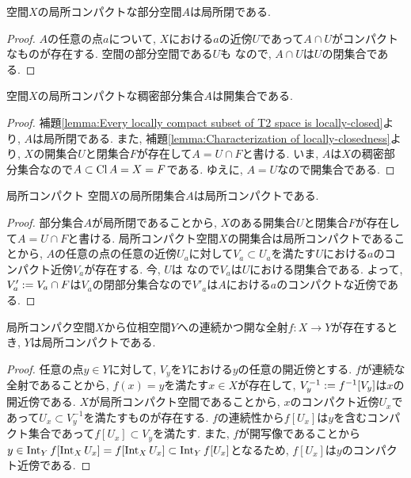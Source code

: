 \documentclass[uplatex, dvipdfmx, a4paper, 12pt, class=jsbook, crop=false]{standalone}
\begin{document}
\begin{proposition}
	\label{lemma:Every locally compact subset of T2 space is locally-closed}
	\Hausdorff 空間$ X $の局所コンパクトな部分空間$ A $は局所閉である.
\end{proposition}

\begin{proof}
	$ A $の任意の点$ a $について, $ X $における$ a $の近傍$ U $であって$ A \cap U $がコンパクトなものが存在する. \Hausdorff 空間の部分空間である$ U $も \Hausdorff なので, $ A \cap U $は$ U $の閉集合である.
\end{proof}

\begin{proposition}
	\label{prop:Any locally compact dense set of a Hausdorff space is open}
	\Hausdorff 空間$ X $の局所コンパクトな稠密部分集合$ A $は開集合である.
\end{proposition}

\begin{proof}
	補題\ref{lemma:Every locally compact subset of T2 space is locally-closed}より, $ A $は局所閉である. また, 補題\ref{lemma:Characterization of locally-closedness}より, $ X $の開集合$ U $と閉集合$ F $が存在して$ A = U \cap F $と書ける. いま, $ A $は$ X $の稠密部分集合なので$ A \subset \mathop{\mathrm{Cl}}\nolimits A = X = F $である. ゆえに, $ A = U $なので開集合である.
\end{proof}

\begin{proposition}
	局所コンパクト \Hausdorff 空間$ X $の局所閉集合$ A $は局所コンパクトである.
\end{proposition}

\begin{proof}
	部分集合$ A $が局所閉であることから, $ X $のある開集合$ U $と閉集合$ F $が存在して$ A = U \cap F $と書ける. 局所コンパクト空間$ X $の開集合は局所コンパクトであることから, $ A $の任意の点の任意の近傍$ U_a $に対して$ V_a \subset U_a $を満たす$ U $における$ a $のコンパクト近傍$ V_a $が存在する. 今, $ U $は \Hausdorff なので$ V_a $は$ U $における閉集合である. よって, $ V'_a \mathrel{:=} V_a \cap F $は$ V_a $の閉部分集合なので$ V'_a $は$ A $における$ a $のコンパクトな近傍である. 
\end{proof}

\begin{proposition}
	局所コンパク空間$ X $から位相空間$ Y $への連続かつ開な全射$ f \colon X \to Y $が存在するとき, $ Y $は局所コンパクトである.
\end{proposition}

\begin{proof}
	任意の点$ y \in Y $に対して, $ V_y $を$ Y $における$ y $の任意の開近傍とする. $ f $が連続な全射であることから, $f(x) = y $を満たす$ x \in X $が存在して, $ V_y^{-1} \mathrel{:=} 
	f^{-1}[V_y] $は$ x $の開近傍である. $ X $が局所コンパクト空間であることから, $ x $のコンパクト近傍$ U_x $であって$ U_x \subset V_y^{-1} $を満たすものが存在する. $ f $の連続性から$ f[U_x] $は$ y $を含むコンパクト集合であって$ f[U_x] \subset V_y $を満たす. また, $ f $が開写像であることから$ y \in \mathop{\mathrm{Int}}\nolimits_Y f[\mathop{\mathrm{Int}}\nolimits_X U_x] = f[\mathop{\mathrm{Int}}\nolimits_X U_x] \subset \mathop{\mathrm{Int}}\nolimits_Y f[U_x] $となるため, $ f[U_x] $は$ y $のコンパクト近傍である.
\end{proof}
\end{document}

